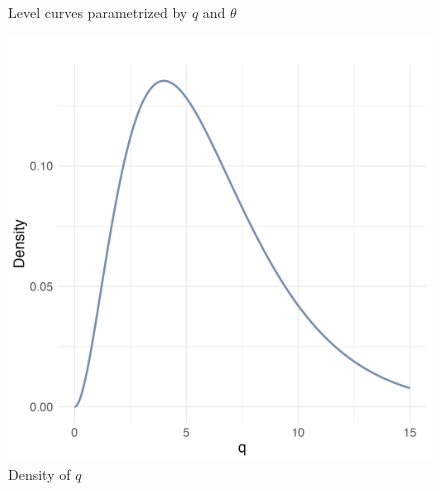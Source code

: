 \documentclass{article}
\begin{document}
\begin{figure}[h!]
\begin{minipage}{0.45\textwidth}
        \caption{Level curves parametrized by $q$ and $\theta$}
    \end{minipage}
    \hfill
    \begin{minipage}{0.45\textwidth}
        \centering
        \includegraphics[width=\linewidth]{plots/density_q_ex1.png}
        \caption{Density of $q$}
    \end{minipage}
\end{figure}
\end{document}
